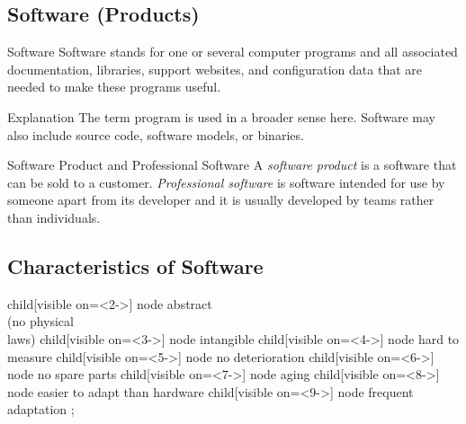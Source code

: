 
\subsection{Software (Products)}
\begin{frame}{\insertsubsection}
	\begin{fancycolumns}
		\begin{definition}{Software }
			Software stands for one or several computer programs and all associated documentation, libraries, support websites, and configuration data that are needed to make these programs useful.
		\end{definition}
		\begin{example}{Explanation}
			The term program is used in a broader sense here. Software may also include source code, software models, or binaries.
		\end{example}
	\nextcolumn
		\begin{definition}{Software Product and Professional Software}
			A \emph{software product} is a software that can be sold to a customer. \emph{Professional software} is software intended for use by someone apart from its developer and it is usually developed by teams rather than individuals. 
		\end{definition}
	\end{fancycolumns}
\end{frame}

\subsection{Characteristics of Software}
\begin{frame}{\insertsubsection}
	\centering\tikz[grow cyclic,
	mindmap, every node/.style=concept,concept color=red!10!background,
	level 1/.append style={level distance=27mm,sibling angle=360/8}]
	child[visible on={<2->}] { node {abstract\\(no physical\\laws)} }
	child[visible on={<3->}] { node {intangible } }
	child[visible on={<4->}] { node {hard to measure} }
	child[visible on={<5->}] { node {no \phantom{abc}deterioration} }
	child[visible on={<6->}] { node {no spare parts} }
	child[visible on={<7->}] { node {aging} }
	child[visible on={<8->}] { node {easier to adapt than hardware} }
	child[visible on={<9->}] { node {frequent adaptation\phantom{;}} }
	;
\end{frame}

